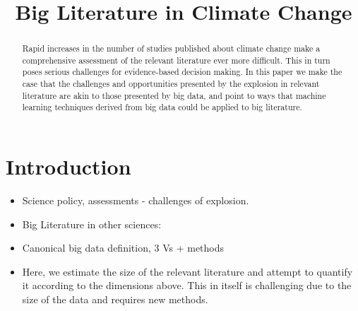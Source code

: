\documentclass{article}
\title{Big Literature in Climate Change}
\begin{document}
\maketitle
\begin{abstract}
Rapid increases in the number of studies published about climate change make a comprehensive assessment of the relevant literature ever more difficult. This in turn poses serious challenges for evidence-based decision making. In this paper we make the case that the challenges and opportunities presented by the explosion in relevant literature are akin to those presented by big data, and point to ways that machine learning techniques derived from big data could be applied to big literature.
\end{abstract}

\section{Introduction}
\begin{itemize}	

	\item Science policy, assessments - challenges of explosion.
    
	\item Big Literature in other sciences: \citet{Nunez-Mir2016}

	\item Canonical big data definition, 3 Vs + methods 

	\item Here, we estimate the size of the relevant literature and attempt to quantify it according to the dimensions above. This in itself is challenging due to the size of the data and requires new methods.  
\end{itemize}
\end{document}
